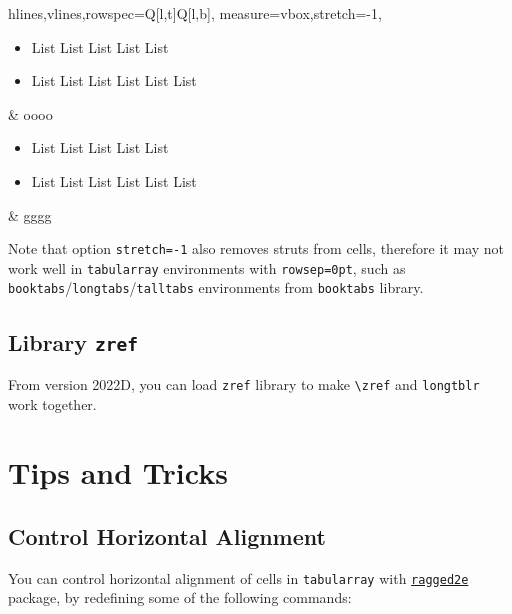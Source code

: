 \documentclass[oneside]{book}
\begin{document}
\begin{codehigh}
\begin{tblr}{
hlines,vlines,rowspec={Q[l,t]Q[l,b]},
measure=vbox,stretch=-1,
}
\begin{itemize}[nosep]
\item List List List List List
\item List List List List List List
\end{itemize} & oooo \\
\begin{itemize}[nosep]
\item List List List List List
\item List List List List List List
\end{itemize} & gggg \\
\end{tblr}
\end{codehigh}

Note that option \verb!stretch=-1! also removes struts from cells, therefore it may not work well
in \verb!tabularray! environments with \verb!rowsep=0pt!, such as
\verb!booktabs!/\verb!longtabs!/\verb!talltabs! environments from \verb!booktabs! library.

\section{Library \texttt{zref}}

From version 2022D, you can load \verb!zref! library
to make \verb!\zref! and \verb!longtblr! work together.

\chapter{Tips and Tricks}

\section{Control Horizontal Alignment}

You can control horizontal alignment of cells in \texttt{tabularray} with
\href{https://www.ctan.org/pkg/ragged2e}{\texttt{ragged2e}} package,
by redefining some of the following commands:

\begin{codehigh}
\RenewDocumentCommand\TblrAlignBoth{}{\justifying}
\RenewDocumentCommand\TblrAlignLeft{}{\RaggedRight}
\RenewDocumentCommand\TblrAlignCenter{}{\Centering}
\RenewDocumentCommand\TblrAlignRight{}{\RaggedLeft}
\end{codehigh}
\end{document}
